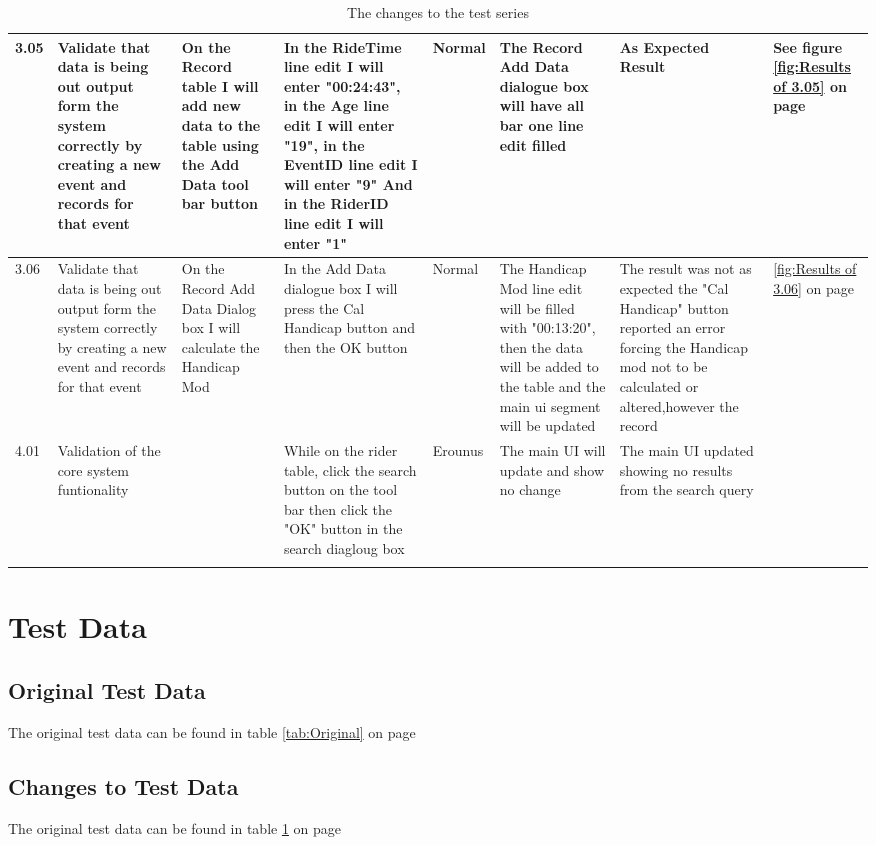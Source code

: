 \begin{landscape}
\begin{center}
\begin{longtable}{|p{1.5cm}|p{2.5cm}|p{2.5cm}|p{2cm}|p{2cm}|p{2cm}|p{2cm}|p{2cm}|}
        \rowcolor{LiteGrey} 3.05 & Validate that data is being out output form the system correctly by creating a new event and records for that event & On the Record table I will add new data to the table using the Add Data tool bar button  & In the RideTime line edit I will enter "00:24:43", in the Age line edit I will enter "19", in the EventID line edit I will enter "9" And in the RiderID line edit I will enter "1"  & Normal & The Record Add Data dialogue box will have all bar one line edit filled  & As Expected Result & See figure \ref{fig:Results of 3.05} on page \pageref{fig:Results of 3.05} \\ \hline
        \rowcolor{LiteGrey} 3.06 & Validate that data is being out output form the system correctly by creating a new event and records for that event & On the Record Add Data Dialog box I will calculate the Handicap Mod & In the Add Data dialogue box I will press the Cal Handicap button and then the OK button & Normal & The Handicap Mod line edit will be filled with "00:13:20", then  the data will be added to the table and the main ui segment will be updated & The result was not as expected the "Cal Handicap" button reported an error forcing the Handicap mod not to be calculated or altered,however the record & \ref{fig:Results of 3.06} on page \pageref{fig:Results of 3.06}\\ \hline

\rowcolor{LiteGrey} 4.01 & Validation of the core system funtionality & & While on the rider table, click the search button on the tool bar then click the "OK" button in the search diagloug box & Erounus & The main UI will update and show no change & The main UI updated showing no results from the search query & \\\hline
        \caption{The changes to the test series}
        \label{tab:Changes} 
    \end{longtable}
\end{center}


\section{Test Data}

\subsection{Original Test Data}
The original test data can be found in table \ref{tab:Original} on page \pageref{tab:Original}

\subsection{Changes to Test Data}
The original test data can be found in table \ref{tab:Changes} on page\pageref{tab:Changes}


\end{landscape}

